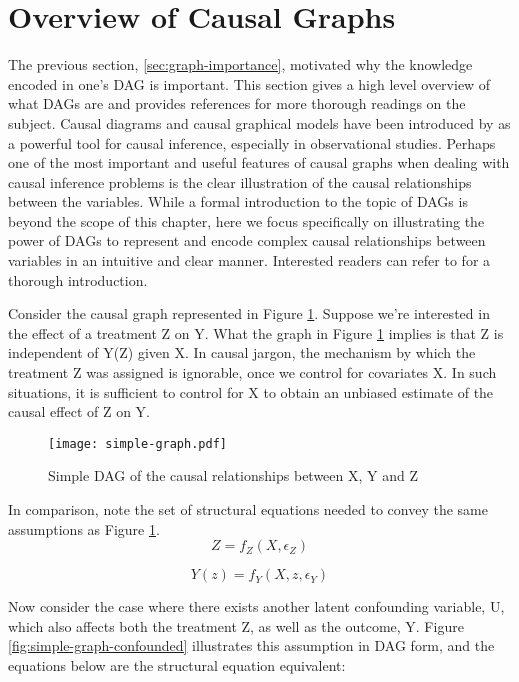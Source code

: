 \section{Overview of Causal Graphs}
\label{sec:graph-overview}
The previous section, \ref{sec:graph-importance}, motivated why the knowledge encoded in one's DAG is important. 
This section gives a high level overview of what DAGs are and provides references for more thorough readings on the subject. 
Causal diagrams and causal graphical models have been introduced by \citet{pearl_causality_1995} as a powerful tool for causal inference, especially in observational studies.
Perhaps one of the most important and useful features of causal
graphs when dealing with causal inference problems is the clear illustration
of the causal relationships between the variables.
While a formal introduction to the topic of DAGs is beyond the scope of this chapter,
here we focus specifically on illustrating the power of DAGs to represent
and encode complex causal relationships between variables in an intuitive and
clear manner.
Interested readers can refer to \citet{pearl_causality_2000} for a thorough introduction.

Consider the causal graph represented in Figure \ref{fig:simple-graph}.
Suppose we're interested in the effect of a treatment Z on Y.
What the graph in Figure \ref{fig:simple-graph} implies is that Z is
independent of Y(Z) given X. In causal jargon, the mechanism by which the treatment Z was assigned is ignorable, once we control for covariates X. 
In such situations, it is sufficient to control for X to obtain an unbiased estimate of the causal effect of Z on Y.

\begin{figure}[h!]
   \centering
   \texttt{[image: simple-graph.pdf]}
   \caption{Simple DAG of the causal relationships between X, Y and Z}
   \label{fig:simple-graph}
\end{figure}

In comparison, note the set of structural equations needed to convey the same assumptions as Figure \ref{fig:simple-graph}.
\[Z = f_Z(X, \epsilon_Z)  \]

\[Y(z) = f_Y(X, z, \epsilon_Y)  \]

Now consider the case where there exists another latent confounding variable, U, which also affects both the treatment Z, as well as the outcome, Y.
Figure \ref{fig:simple-graph-confounded} illustrates this assumption in DAG form, and the equations below are the structural equation equivalent:

